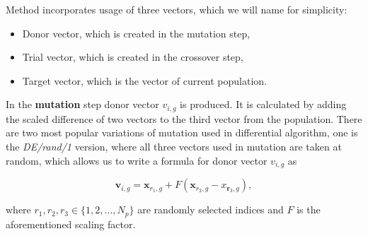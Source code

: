 \documentclass[12pt,a4paper,openany]{book}
\begin{document}
\noindent Method incorporates usage of three vectors, which we will name for simplicity:

\begin{itemize}
\item Donor vector, which is created in the mutation step,
\item Trial vector, which is created in the crossover step,
\item Target vector, which is the vector of current population.
\end{itemize}


\noindent In the \textbf{mutation} step donor vector $v_{i, g}$ is produced. It is calculated by adding the scaled difference of two vectors to the third vector from the population. There are two most popular variations of mutation used in differential algorithm, one is the \textit{DE/rand/1} version, where all three vectors used in mutation are taken at random, which allows us to write a formula for donor vector  $v_{i, g}$ as

\begin{equation}
\mathbf{v}_{i, g}=\mathbf{x}_{r_{1}, g}+F\left(\mathbf{x}_{r_{2}, g}-x_{\mathbf{r}_{3}, g}\right),
\end{equation}

\noindent where $r_{1}, r_{2},r_{3} \in \{1, 2, ..., N_{p}\}$ are randomly selected indices and $F$ is the aforementioned scaling factor.
\end{document}
